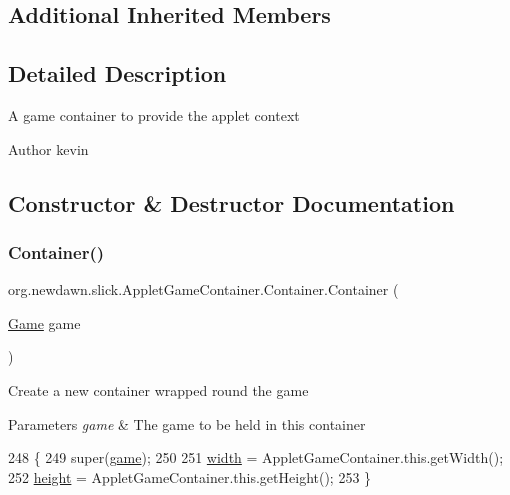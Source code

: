 \subsection*{Additional Inherited Members}


\subsection{Detailed Description}
A game container to provide the applet context

\begin{DoxyAuthor}{Author}
kevin 
\end{DoxyAuthor}


\subsection{Constructor \& Destructor Documentation}
\mbox{\label{classorg_1_1newdawn_1_1slick_1_1_applet_game_container_1_1_container_a7bd5da0f75b3efe21dd7a756e3f37dd6}} 
\subsubsection{\texorpdfstring{Container()}{Container()}}
{\footnotesize\ttfamily org.\+newdawn.\+slick.\+Applet\+Game\+Container.\+Container.\+Container (\begin{DoxyParamCaption}\item[{\mbox{\hyperlink{interfaceorg_1_1newdawn_1_1slick_1_1_game}{Game}}}]{game }\end{DoxyParamCaption})\hspace{0.3cm}{\ttfamily [inline]}}

Create a new container wrapped round the game


\begin{DoxyParams}{Parameters}
{\em game} & The game to be held in this container \\
\hline
\end{DoxyParams}

\begin{DoxyCode}
248                                   \{
249          super(\mbox{\hyperlink{classorg_1_1newdawn_1_1slick_1_1_game_container_a6a38bb26e45e1c884940caf35c7cfcdc}{game}});
250 
251          \mbox{\hyperlink{classorg_1_1newdawn_1_1slick_1_1_game_container_a8c65160202b9f5aafde3fcf03e6155c9}{width}} = AppletGameContainer.this.getWidth();
252          \mbox{\hyperlink{classorg_1_1newdawn_1_1slick_1_1_game_container_aac7312a21bbcaabec14be965c683d970}{height}} = AppletGameContainer.this.getHeight();
253       \}
\end{DoxyCode}



